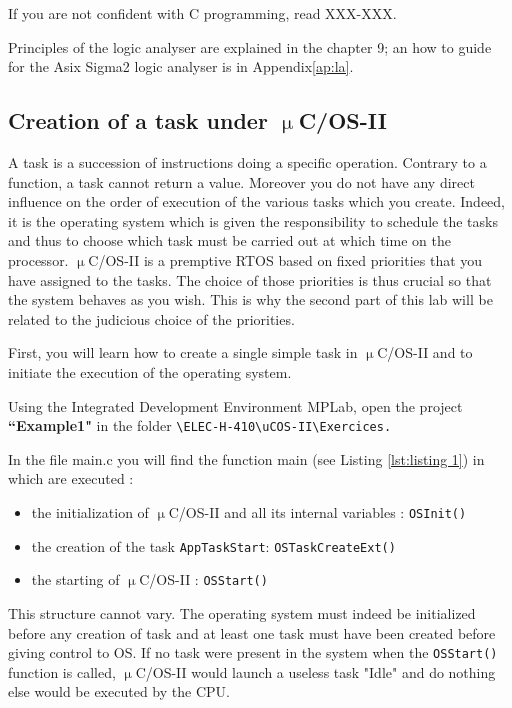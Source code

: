 \documentclass[10pt,a4paper]{article}
\theoremstyle{definition}%
\newcommand{\uCOSII}{$\upmu$C/OS-II }
\newcommand{\kw}[1]{\texttt{#1}}
\begin{document}
If you are not confident with C programming, read XXX-XXX.

Principles of the logic analyser are explained in the chapter 9; an how to guide for the Asix Sigma2 logic analyser is in Appendix\ref{ap:la}.

\subsection{Creation of a task under \uCOSII}

A task is a succession of instructions doing a specific operation. Contrary to a function, a task cannot
return a value. Moreover you do not have any direct influence on the order of execution of the various
tasks which you create. Indeed, it is the operating system which is given the responsibility to schedule
the tasks and thus to choose which task must be carried out at which time on the processor. \uCOSII 
is a premptive RTOS based on fixed priorities that you have assigned to the tasks. The choice of those
priorities is thus crucial so that the system behaves as you wish. This is why the second part of this lab
will be related to the judicious choice of the priorities.

First, you will learn how to create a single simple task in \uCOSII and to initiate the execution of the
operating system.

Using the Integrated Development Environment MPLab, open the project \textbf{``Example1"} in the folder
\verb!\ELEC-H-410\uCOS-II\Exercices.!

In the file main.c you will find the function main (see Listing \ref{lst:listing 1}) in which are executed :
\begin{itemize}
\item the initialization of \uCOSII and all its internal variables : \kw{OSInit()}
\item the creation of the task \kw{AppTaskStart}: \kw{OSTaskCreateExt()}
\item the starting of \uCOSII: \kw{OSStart()}
\end{itemize}

This structure cannot vary. The operating system must indeed be initialized before any creation of task
and at least one task must have been created before giving control to OS. If no task were present in
the system when the \kw{OSStart()} function is called, \uCOSII would launch a useless task "Idle" and do
nothing else would be executed by the CPU.
\end{document}
